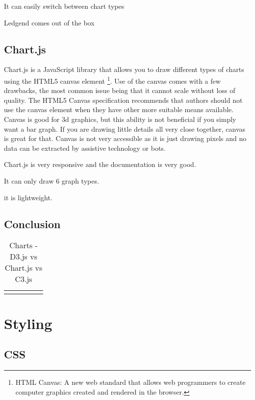 \documentclass[draftclsnofoot,onecolumn,letterpaper,10pt,compsoc]{IEEEtran}
\begin{document}
  It can easily switch between chart types

  Ledgend comes out of the box

  \subsection{Chart.js}
  Chart.js is a JavaScript library that allows you to draw different types of charts using the HTML5 canvas element
  \footnote{HTML Canvas: A new web standard that allows web programmers to create computer graphics created and rendered in the browser.}.
  Use of the canvas comes with a few drawbacks, the most common issue being that it cannot scale without loss of quality.
  The HTML5 Canvas specification recommends that authors should not use the canvas element when they have other more suitable means available.\cite{CanvasVsSVG}
  Canvas is good for 3d graphics, but this ability is not beneficial if you simply want a bar graph.
  If you are drawing little details all very close together, canvas is great for that.
  Canvas is not very accessible as it is just drawing pixels and no data can be extracted by assistive technology or bots.

  Chart.js is very responsive and the documentation is very good.

  It can only draw 6 graph types.

  it is lightweight.

  \subsection{Conclusion}


  \begin{landscape}
    \begin{table}[]
    \centering
    \caption{Charts - D3.js vs Chart.js vs C3.js}
    \label{my-label}
      \begin{tabular}{lllll}
        &  &  &  & \\
      \end{tabular}
    \end{table}
  \end{landscape}


\section{Styling}

  \subsection{CSS}
\end{document}
